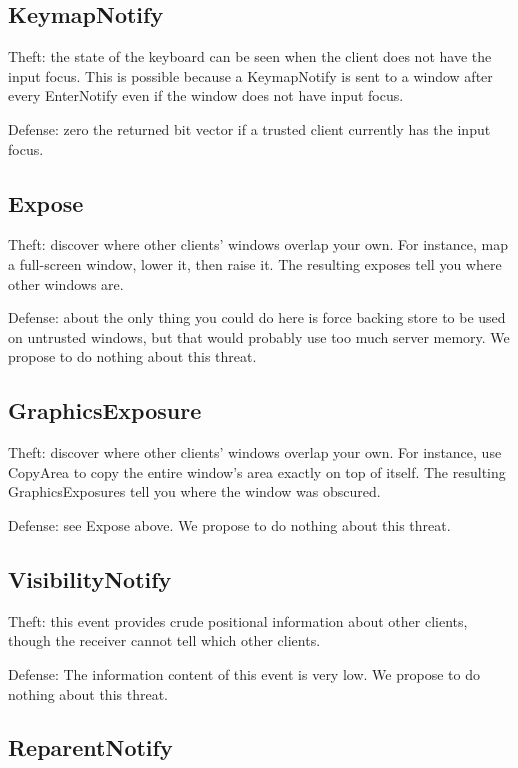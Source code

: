 \documentclass{article}
\begin{document}
\subsection{KeymapNotify}

Theft: the state of the keyboard can be seen when the client does not
have the input focus.  This is possible because a KeymapNotify is
sent to a window after every EnterNotify even if the window does not
have input focus.

Defense: zero the returned bit vector if a trusted client currently
has the input focus.



\subsection{Expose}

Theft: discover where other clients' windows overlap your own.  For
instance, map a full-screen window, lower it, then raise it.  The
resulting exposes tell you where other windows are.

Defense: about the only thing you could do here is force backing store
to be used on untrusted windows, but that would probably use too much
server memory.  We propose to do nothing about this threat.



\subsection{GraphicsExposure}

Theft: discover where other clients' windows overlap your own.
For instance, use CopyArea to copy the entire window's area exactly
on top of itself.  The resulting GraphicsExposures tell you where
the window was obscured.

Defense: see Expose above.  We propose to do nothing about this
threat.


\subsection{VisibilityNotify}

Theft: this event provides crude positional information about other
clients, though the receiver cannot tell which other clients.

Defense: The information content of this event is very low.  We
propose to do nothing about this threat.



\subsection{ReparentNotify}
\end{document}
